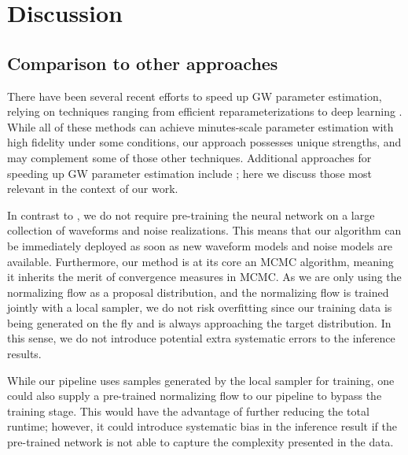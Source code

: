 \documentclass[twocolumn]{aastex631}
\begin{document}
\section{Discussion}
\label{sec: Discussion}

\subsection{Comparison to other approaches}

There have been several recent efforts to speed up GW parameter estimation,
relying on techniques ranging from efficient reparameterizations
\citep{Islam:2022afg,Roulet:2022kot} to deep learning
\citep{Dax:2021tsq,Dax:2022pxd}. While all of these methods can achieve
minutes-scale parameter estimation with high fidelity under some conditions,
our approach possesses unique strengths, and may complement some of those other
techniques. Additional approaches for speeding up GW parameter estimation include
\cite{Canizares:2014fya,Smith:2016qas,Lee:2022jpn,Wofford:2022ykb,Lange:2018pyp,Williams:2021qyt,Morisaki:2021ngj};
here we discuss those most relevant in the context of our work.

In contrast to \cite{Dax:2021tsq,Dax:2022pxd}, we do not require pre-training
the neural network on a large collection of waveforms and noise realizations.
This means that our algorithm can be immediately deployed as soon as new
waveform models and noise models are available. Furthermore, our method is at
its core an MCMC algorithm, meaning it inherits the merit of convergence
measures in MCMC. As we are only using the normalizing flow as a proposal
distribution, and the normalizing flow is trained jointly with a local sampler,
we do not risk overfitting since our training data is being generated on the
fly and is always approaching the target distribution. In this sense, we do not
introduce potential extra systematic errors to the inference results.

While our pipeline uses samples generated by the local sampler for training,
one could also supply a pre-trained normalizing flow to our pipeline to bypass
the training stage. This would have the advantage of further reducing the total
runtime; however, it could introduce systematic bias in the inference result if
the pre-trained network is not able to capture the complexity presented in the
data.
\end{document}

